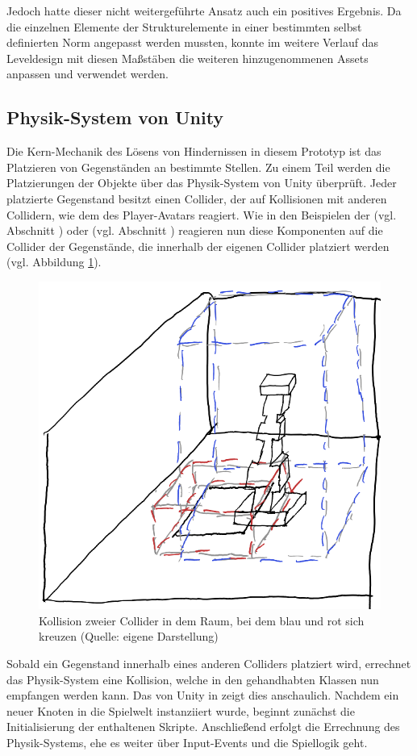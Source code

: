 Jedoch hatte dieser nicht weitergeführte Ansatz auch ein positives Ergebnis. Da die einzelnen Elemente der Strukturelemente in einer bestimmten selbst definierten Norm angepasst werden mussten, konnte im weitere Verlauf das Leveldesign mit diesen Maßstäben die weiteren hinzugenommenen Assets anpassen und verwendet werden.

\subsection{Physik-System von Unity}\label{sec:unity-physics-system}
Die Kern-Mechanik des Lösens von Hindernissen in diesem Prototyp ist das Platzieren von Gegenständen an bestimmte Stellen. Zu einem Teil werden die Platzierungen der Objekte über das Physik-System von Unity überprüft. Jeder platzierte Gegenstand besitzt einen Collider, der auf Kollisionen mit anderen Collidern, wie dem des Player-Avatars reagiert. Wie in den Beispielen der  (vgl. Abschnitt ) oder  (vgl. Abschnitt ) reagieren nun diese Komponenten auf die Collider der Gegenstände, die innerhalb der eigenen Collider platziert werden (vgl. Abbildung \ref{fig:collision-sketch}). 

\begin{figure}[ht]
\centering
\includegraphics[width=.6\linewidth]{content/pictures/CollisionSketch.png}
\caption{Kollision zweier Collider in dem Raum, bei dem blau und rot sich kreuzen (Quelle: eigene Darstellung)}
\label{fig:collision-sketch}
\end{figure}


Sobald ein Gegenstand innerhalb eines anderen Colliders platziert wird, errechnet das Physik-System eine Kollision, welche in den gehandhabten Klassen nun empfangen werden kann. Das  von Unity in \cite{technologies_unity_nodate} zeigt dies anschaulich. Nachdem ein neuer Knoten in die Spielwelt instanziiert wurde, beginnt zunächst die Initialisierung der enthaltenen Skripte. Anschließend erfolgt die Errechnung des Physik-Systems, ehe es weiter über Input-Events und die Spiellogik geht.

